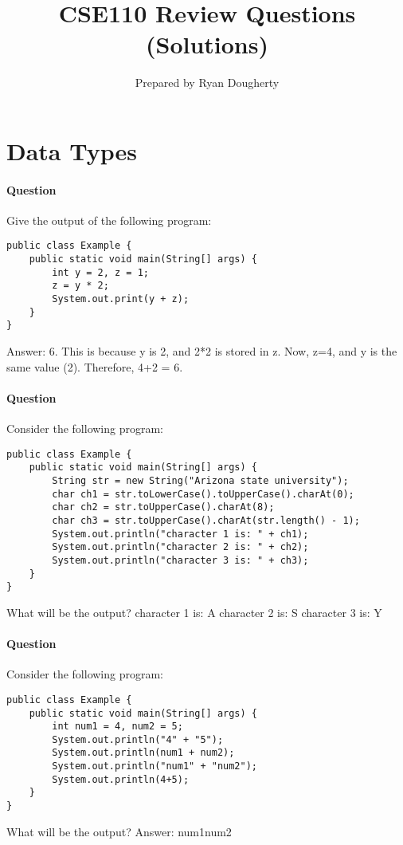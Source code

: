 \documentclass{article}
\title{CSE110 Review Questions (Solutions)}
\author{Prepared by Ryan Dougherty}
\date{}
\begin{document}
\maketitle

\setcounter{question_num}{1}

\section*{Data Types}

\setcounter{question_num}{1}
\paragraph{Question }
Give the output of the following program:
\begin{lstlisting}
public class Example {
	public static void main(String[] args) {
		int y = 2, z = 1;
		z = y * 2;
		System.out.print(y + z);
	}
}
\end{lstlisting}
{\color{red}Answer: 6. This is because y is 2, and 2*2 is stored in z. Now, z=4, and y is the same value (2). Therefore, 4+2 = 6.}

\addtocounter{question_num}{1}
\paragraph{Question }
Consider the following program:
\begin{lstlisting}
public class Example {
	public static void main(String[] args) {
		String str = new String("Arizona state university");
		char ch1 = str.toLowerCase().toUpperCase().charAt(0);
		char ch2 = str.toUpperCase().charAt(8);
		char ch3 = str.toUpperCase().charAt(str.length() - 1);
		System.out.println("character 1 is: " + ch1);
		System.out.println("character 2 is: " + ch2);
		System.out.println("character 3 is: " + ch3);
	}
}
\end{lstlisting}
What will be the output?
\newline
{\color{red}character 1 is: A
\newline character 2 is: S
\newline character 3 is: Y}

\addtocounter{question_num}{1}
\paragraph{Question }
Consider the following program:
\begin{lstlisting}
public class Example {
	public static void main(String[] args) {
		int num1 = 4, num2 = 5;
		System.out.println("4" + "5");
		System.out.println(num1 + num2);
		System.out.println("num1" + "num2");
		System.out.println(4+5);
	}
}
\end{lstlisting}
What will be the output?
\newline
{\color{red}Answer:
\newline num1num2
}
\end{document}
